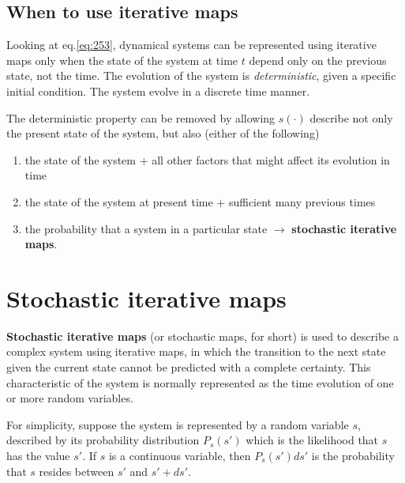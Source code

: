 \subsection{When to use iterative maps}
\label{sec:when-use-iterative}

Looking at eq.\ref{eq:253}, dynamical systems can be represented using
iterative maps only when the state of the system at time $t$ depend
only on the previous state, not the time. The evolution of the system
is {\it deterministic}, given a specific initial condition. The system
evolve in a discrete time manner. 

The deterministic property can be removed by allowing $s(\cdot)$
describe not only the present state of the system, but also (either of
the following)
\begin{enumerate}
\item the state of the system + all other factors that might affect
  its evolution in time
\item the state of the system at present time + sufficient many
  previous times
\item the probability that a system in a particular state
  $\rightarrow$ {\bf stochastic iterative maps}.
\end{enumerate}

\section{Stochastic iterative maps}
\label{sec:stoch-iter-maps}

{\bf Stochastic iterative maps} (or stochastic maps, for short) is
used to describe a complex system using iterative maps, in which the
transition to the next state given the current state cannot be
predicted with a complete certainty. This characteristic of the system
is normally represented as the time evolution of one or more random
variables.

For simplicity, suppose the system is represented by a random variable
$s$, described by its probability distribution $P_s(s')$ which is the
likelihood that $s$ has the value $s'$. If $s$ is a continuous
variable, then $P_s(s')ds'$ is the probability that $s$ resides
between $s'$ and $s'+ds'$.

